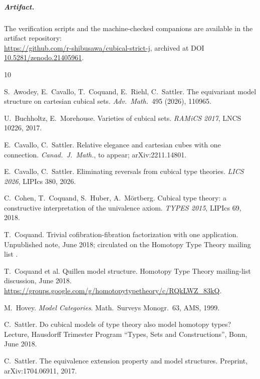 \documentclass[11pt]{amsart}
\theoremstyle{definition}
\begin{document}
\subparagraph*{Artifact.}  The verification scripts and the
machine-checked companions are available in the artifact
repository:\\
\url{https://github.com/r-shibusawa/cubical-strict-j}, archived
at DOI \href{https://doi.org/10.5281/zenodo.21405961}%
{10.5281/zenodo.21405961}.

\begin{thebibliography}{10}

S.~Awodey, E.~Cavallo, T.~Coquand, E.~Riehl, C.~Sattler.
\newblock The equivariant model structure on cartesian cubical
  sets.
\newblock \emph{Adv.\ Math.}\ 495 (2026), 110965.

U.~Buchholtz, E.~Morehouse.
\newblock Varieties of cubical sets.
\newblock \emph{RAMiCS 2017}, LNCS 10226, 2017.

E.~Cavallo, C.~Sattler.
\newblock Relative elegance and cartesian cubes with one
  connection.
\newblock \emph{Canad.\ J.\ Math.}, to appear; arXiv:2211.14801.

E.~Cavallo, C.~Sattler.
\newblock Eliminating reversals from cubical type theories.
\newblock \emph{LICS 2026}, LIPIcs 380, 2026.

C.~Cohen, T.~Coquand, S.~Huber, A.~M\"ortberg.
\newblock Cubical type theory: a constructive interpretation of the
  univalence axiom.
\newblock \emph{TYPES 2015}, LIPIcs 69, 2018.

T.~Coquand.
\newblock Trivial cofibration-fibration factorization with one
  application.
\newblock Unpublished note, June 2018; circulated on the Homotopy
  Type Theory mailing list \cite{CoqML}.

T.~Coquand et al.
\newblock Quillen model structure.
\newblock Homotopy Type Theory mailing-list discussion, June 2018.
\newblock \url{https://groups.google.com/g/homotopytypetheory/c/RQkLWZ_83kQ}.

M.~Hovey.
\newblock \emph{Model Categories}.
\newblock Math.\ Surveys Monogr.\ 63, AMS, 1999.

C.~Sattler.
\newblock Do cubical models of type theory also model homotopy
  types?
\newblock Lecture, Hausdorff Trimester Program ``Types, Sets and
  Constructions'', Bonn, June 2018.

C.~Sattler.
\newblock The equivalence extension property and model structures.
\newblock Preprint, arXiv:1704.06911, 2017.


\end{thebibliography}
\end{document}
